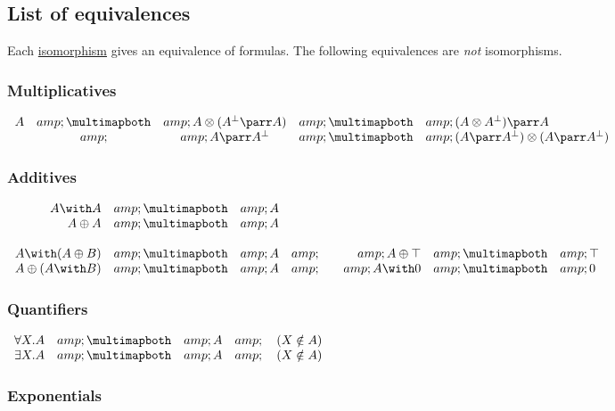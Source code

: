 \subsection{List of equivalences}\label{list-of-equivalences}

Each \href{List_of_isomorphisms}{isomorphism} gives an equivalence of
formulas. The following equivalences are \emph{not} isomorphisms.

\subsubsection{Multiplicatives}\label{multiplicatives-1}

\(\begin{array}{rcccl}
A &amp;\linequiv&amp; A \tens (A\orth\parr A) &amp;\linequiv&amp; (A\tens A\orth)\parr A \\
&amp; &amp; A\parr A\orth &amp;\linequiv&amp; (A\parr A\orth)\tens(A\parr A\orth)
\end{array}\)

\subsubsection{Additives}\label{additives-1}

\(\begin{array}{rclcrcl}
A \with A &amp;\linequiv&amp; A \\
A \plus A &amp;\linequiv&amp; A \\
\\
  A \with (A \plus B) &amp;\linequiv&amp; A &amp;\quad&amp; A \plus \top &amp;\linequiv&amp; \top \\
  A \plus (A \with B) &amp;\linequiv&amp; A &amp;\quad&amp; A \with \zero &amp;\linequiv&amp; \zero
\end{array}\)

\subsubsection{Quantifiers}\label{quantifiers}

\(\begin{array}{rcll}
  \forall X.A &amp;\linequiv&amp; A &amp;\quad (X\notin A) \\
  \exists X.A &amp;\linequiv&amp; A &amp;\quad (X\notin A)
\end{array}\)

\subsubsection{Exponentials}\label{exponentials-2}


